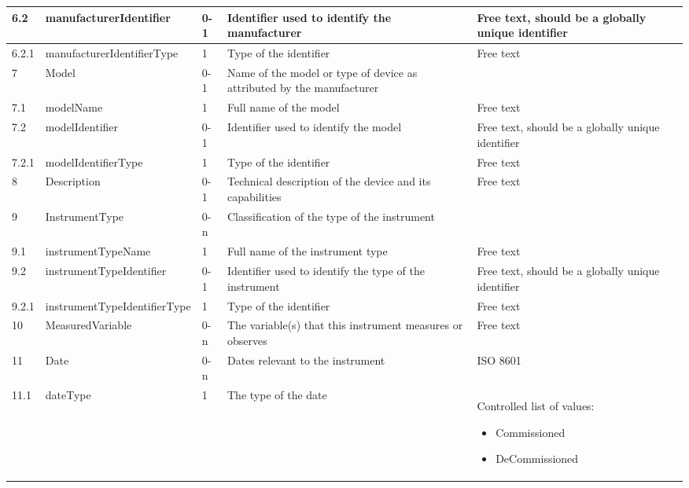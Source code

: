 \documentclass[titlepage=true,twoside=false,DIV=13]{scrartcl}
\begin{document}
\begin{longtable}{|l|l|l|p{}|p{\valcolw}|}
  6.2   & manufacturerIdentifier       & 0-1
        & Identifier used to identify the manufacturer
        & Free text, should be a globally unique identifier \\
  \hline
  6.2.1 & manufacturerIdentifierType   & 1
        & Type of the identifier & Free text \\
  \hline
  7     & Model                        & 0-1
        & Name of the model or type of device as attributed by the
          manufacturer
        & \\
  \hline
  7.1   & modelName                    & 1
        & Full name of the model & Free text \\
  \hline
  7.2   & modelIdentifier              & 0-1
        & Identifier used to identify the model
        & Free text, should be a globally unique identifier \\
  \hline
  7.2.1 & modelIdentifierType          & 1
        & Type of the identifier & Free text \\
  \hline
  8     & Description                  & 0-1
        & Technical description of the device and its capabilities
        & Free text \\
  \hline
  9     & InstrumentType               & 0-n
        & Classification of the type of the instrument & \\
  \hline
  9.1   & instrumentTypeName           & 1
        & Full name of the instrument type & Free text \\
  \hline
  9.2   & instrumentTypeIdentifier     & 0-1
        & Identifier used to identify the type of the instrument
        & Free text, should be a globally unique identifier \\
  \hline
  9.2.1 & instrumentTypeIdentifierType & 1
        & Type of the identifier & Free text \\
  \hline
  10    & MeasuredVariable             & 0-n
        & The variable(s) that this instrument measures or observes
        & Free text \\
  \hline
  11    & Date                         & 0-n
        & Dates relevant to the instrument & ISO 8601 \\
  \hline
  11.1  & dateType                     & 1
        & The type of the date
        & \begin{minipage}[t]{\valcolw}
            Controlled list of values:
            \begin{itemize}[nosep,leftmargin=3.5ex]
            \item Commissioned
            \item DeCommissioned

\end{itemize}
\end{minipage}
\end{longtable}
\end{document}
